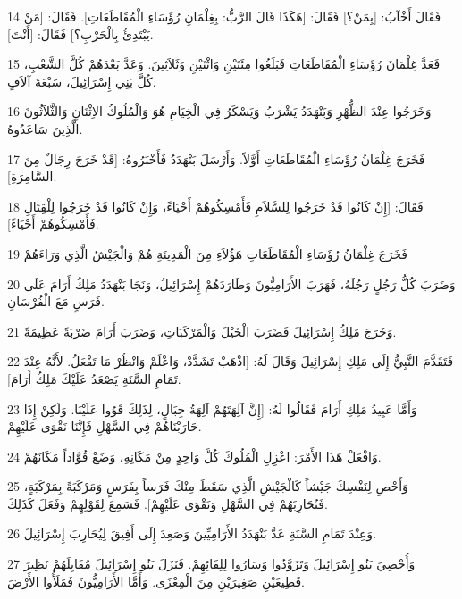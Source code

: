 \par 14 فَقَالَ أَخْآبُ: [بِمَنْ؟] فَقَالَ: [هَكَذَا قَالَ الرَّبُّ: بِغِلْمَانِ رُؤَسَاءِ الْمُقَاطَعَاتِ]. فَقَالَ: [مَنْ يَبْتَدِئُ بِالْحَرْبِ؟] فَقَالَ: [أَنْتَ].
\par 15 فَعَدَّ غِلْمَانَ رُؤَسَاءِ الْمُقَاطَعَاتِ فَبَلَغُوا مِئَتَيْنِ وَاثْنَيْنِ وَثَلاَثِينَ. وَعَدَّ بَعْدَهُمْ كُلَّ الشَّعْبِ، كُلَّ بَنِي إِسْرَائِيلَ، سَبْعَةَ آلاَفٍ.
\par 16 وَخَرَجُوا عِنْدَ الظُّهْرِ وَبَنْهَدَدُ يَشْرَبُ وَيَسْكَرُ فِي الْخِيَامِ هُوَ وَالْمُلُوكُ الاِثْنَانِ وَالثَّلاَثُونَ الَّذِينَ سَاعَدُوهُ.
\par 17 فَخَرَجَ غِلْمَانُ رُؤَسَاءِ الْمُقَاطَعَاتِ أَوَّلاً. وَأَرْسَلَ بَنْهَدَدُ فَأَخْبَرُوهُ: [قَدْ خَرَجَ رِجَالٌ مِنَ السَّامِرَةِ].
\par 18 فَقَالَ: [إِنْ كَانُوا قَدْ خَرَجُوا لِلسَّلاَمِ فَأَمْسِكُوهُمْ أَحْيَاءً، وَإِنْ كَانُوا قَدْ خَرَجُوا لِلْقِتَالِ فَأَمْسِكُوهُمْ أَحْيَاءً].
\par 19 فَخَرَجَ غِلْمَانُ رُؤَسَاءِ الْمُقَاطَعَاتِ هَؤُلاَءِ مِنَ الْمَدِينَةِ هُمْ وَالْجَيْشُ الَّذِي وَرَاءَهُمْ
\par 20 وَضَرَبَ كُلُّ رَجُلٍ رَجُلَهُ، فَهَرَبَ الأَرَامِيُّونَ وَطَارَدَهُمْ إِسْرَائِيلُ، وَنَجَا بَنْهَدَدُ مَلِكُ أَرَامَ عَلَى فَرَسٍ مَعَ الْفُرْسَانِ.
\par 21 وَخَرَجَ مَلِكُ إِسْرَائِيلَ فَضَرَبَ الْخَيْلَ وَالْمَرْكَبَاتِ، وَضَرَبَ أَرَامَ ضَرْبَةً عَظِيمَةً.
\par 22 فَتَقَدَّمَ النَّبِيُّ إِلَى مَلِكِ إِسْرَائِيلَ وَقَالَ لَهُ: [اذْهَبْ تَشَدَّدْ، وَاعْلَمْ وَانْظُرْ مَا تَفْعَلُ. لأَنَّهُ عِنْدَ تَمَامِ السَّنَةِ يَصْعَدُ عَلَيْكَ مَلِكُ أَرَامَ].
\par 23 وَأَمَّا عَبِيدُ مَلِكِ أَرَامَ فَقَالُوا لَهُ: [إِنَّ آلِهَتَهُمْ آلِهَةُ جِبَالٍ، لِذَلِكَ قَوُوا عَلَيْنَا. وَلَكِنْ إِذَا حَارَبْنَاهُمْ فِي السَّهْلِ فَإِنَّنَا نَقْوَى عَلَيْهِمْ.
\par 24 وَافْعَلْ هَذَا الأَمْرَ: اعْزِلِ الْمُلُوكَ كُلَّ وَاحِدٍ مِنْ مَكَانِهِ، وَضَعْ قُوَّاداً مَكَانَهُمْ.
\par 25 وَأَحْصِ لِنَفْسِكَ جَيْشاً كَالْجَيْشِ الَّذِي سَقَطَ مِنْكَ فَرَساً بِفَرَسٍ وَمَرْكَبَةً بِمَرْكَبَةٍ، فَنُحَارِبَهُمْ فِي السَّهْلِ وَنَقْوَى عَلَيْهِمْ]. فَسَمِعَ لِقَوْلِهِمْ وَفَعَلَ كَذَلِكَ.
\par 26 وَعِنْدَ تَمَامِ السَّنَةِ عَدَّ بَنْهَدَدُ الأَرَامِيِّينَ وَصَعِدَ إِلَى أَفِيقَ لِيُحَارِبَ إِسْرَائِيلَ.
\par 27 وَأُحْصِيَ بَنُو إِسْرَائِيلَ وَتَزَوَّدُوا وَسَارُوا لِلِقَائِهِمْ. فَنَزَلَ بَنُو إِسْرَائِيلَ مُقَابِلَهُمْ نَظِيرَ قَطِيعَيْنِ صَغِيرَيْنِ مِنَ الْمِعْزَى. وَأَمَّا الأَرَامِيُّونَ فَمَلَأُوا الأَرْضَ.
